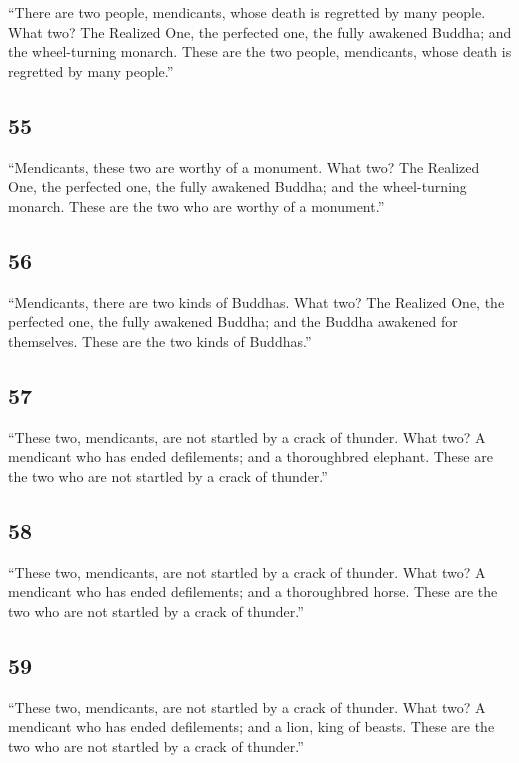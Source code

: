 \documentclass[12pt,openany]{book}%
\begin{document}
“There are two people, mendicants, whose death is regretted by many people. What two? The Realized One, the perfected one, the fully awakened Buddha; and the wheel-turning monarch. These are the two people, mendicants, whose death is regretted by many people.” 

\subsection*{55 }

“Mendicants, these two are worthy of a monument. What two? The Realized One, the perfected one, the fully awakened Buddha; and the wheel-turning monarch. These are the two who are worthy of a monument.” 

\subsection*{56 }

“Mendicants, there are two kinds of Buddhas. What two? The Realized One, the perfected one, the fully awakened Buddha; and the Buddha awakened for themselves. These are the two kinds of Buddhas.” 

\subsection*{57 }

“These two, mendicants, are not startled by a crack of thunder. What two? A mendicant who has ended defilements; and a thoroughbred elephant. These are the two who are not startled by a crack of thunder.” 

\subsection*{58 }

“These two, mendicants, are not startled by a crack of thunder. What two? A mendicant who has ended defilements; and a thoroughbred horse. These are the two who are not startled by a crack of thunder.” 

\subsection*{59 }

“These two, mendicants, are not startled by a crack of thunder. What two? A mendicant who has ended defilements; and a lion, king of beasts. These are the two who are not startled by a crack of thunder.” 
\end{document}
